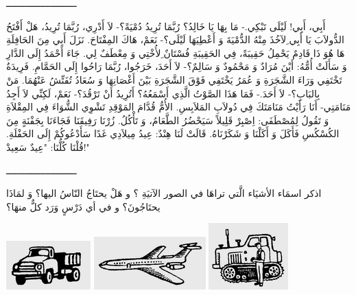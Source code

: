 \documentclass[a5paper]{article}
\begin{document}
ـــــــــــــــــــــــــ

أَبِي، أَبِي! لَيْلَى تَبْكِي.- مَا بِهَا يَا خَالِدُ؟ رُبَّمَا تُرِيدُ دُمْيَةً؟- لاَ أَدْرِي، رُبَّمَا تُرِيدُ، هَلْ أَفْتَحُ الدُّولاَبَ يَا أَبِي ِلآخُذَ مِنْهُ الدُّمْيَةَ وَ أَعْطِيَهَا لَيْلَى؟- نَعَمْ، هَاكَ المِفْتَاحَ. نَزَلَ أَبِي مِنَ الحَافِلَةِ هَا هُوَ ذَا قَادِمٌ يَحْمِلُ حَقِيبَةً، فِي الحَقِيبَةِ فُسْتَانٌ ِلأُخْتِي وَ مِعْطَفٌ لِي. جَاءَ أَحْمَدُ إِلَى الدَّارِ وَ سَأَلَتْ أُمُّهُ: أَيْنَ مُرَادٌ وَ مَحْمُودٌ وَ سَالِمٌ؟- لاَ أَحَدَ، خَرَجُوا، رُبَّمَا رَاحُوا إِلَى الحَمَّامِ. فَرِيدَةُ تَخْتَفِي وَرَاءَ الشَّجَرَةِ وَ عُمَرُ يَخْتَفِي فَوْقَ الشَّجَرَةِ بَيْنَ أَغْصَانِهَا وَ سُعَادُ تُفَتِّشُ عَنْهُمَا. مَنْ بِالبَابِ؟- لاَ أَحَدَ.- فَمَا هَذَا الصَّوْتُ الَّذِي أَسْمَعُهُ؟ أَتُرِيدُ أَنْ تَرْقُدَ؟- نَعَمْ، لَكِنِّي لاَ أَجِدُ مَنَامَتِي- أَنَا رَأَيْتُ مَنَامَتَكَ فِي دُولاَبِ المَلاَبِسِ. الأُمُّ قُدَّامَ المَوْقِدِ تَشْوِي الشُّوَاءَ فِي المِقْلاَةِ وَ تَقُولُ لِمُصْطَفَى: اِصْبِرْ قَلِيلاً سَيَحْضُرُ الطَّعَامُ، وَ تَأْكُلُ. زُرْنَا رَفِيقَنَا فَجَاءَنَا بِجَفْنَةٍ مِنَ الكُسْكُسِ فَأَكَلَ وَ أَكَلْنَا وَ شَكَرْنَاهُ. قَالَتْ لَنَا هِنْدٌ: عِيدُ مِيلاَدِي غَدًا سَأَدْعُوكُمْ إِلَى الحَفْلَةِ. قُلْنَا كُلُّنَا: "عِيدٌ سَعِيدْ!"

ـــــــــــــــــــــــــ

اذكر اسمَاء الأشيَاء الَّتي تراهَا في الصور الآتيَةِ ؟ و هَلْ يحتَاجُ النّاسُ اليها؟ وَ لمَاذَا يحتَاجُونَ؟ و في أي دَرْسٍ وَرَد كلٌّ منهَا؟ 

 \includegraphics[width=1.2811in,height=0.7398in]{MuhammadBagauddinlatinized-img305.png}   \includegraphics[width=1.698in,height=0.802in]{MuhammadBagauddinlatinized-img306.png}   \includegraphics[width=1.2083in,height=1.0102in]{MuhammadBagauddinlatinized-img307.png} 
\end{document}
